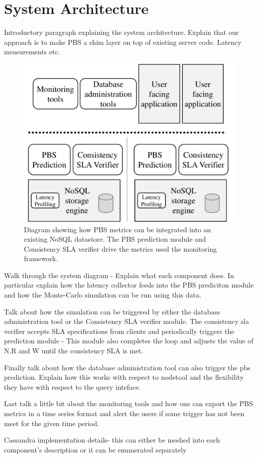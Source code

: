 \section{System Architecture}
\label{sec:architecture}

Introductory paragraph explaining the system architecture. Explain that our
approach is to make PBS a shim layer on top of existing server code. Latency
measurements etc.

\begin{figure}
\centering
\includegraphics[width=.90\columnwidth]{figs/pbs-sys-arch.pdf}
\caption{Diagram showing how PBS metrics can be integrated into an existing
NoSQL datastore. The PBS prediction module and Consistency SLA verifier drive
the metrics used the monitoring framework.}
\label{fig:pbs-sys-arch}
\end{figure}

Walk through the system diagram - Explain what each component does. In
particular explain how the latency collector feeds into the PBS prediciton
module and how the Monte-Carlo simulation can be run using this data.

Talk about how the simulation can be triggered by either the database
administration tool or the Consistency SLA verifier module. The consistency sla
verifier accepts SLA specifications from clients and periodically triggers the
prediction module - This module also completes the loop and adjusts the value of
N,R and W until the consistency SLA is met.

Finally talk about how the database administration tool can also trigger the pbs
prediction. Explain how this works with respect to nodetool and the flexibility
they have with respect to the query inteface.

Last talk a little bit about the monitoring tools and how one can export the PBS
metrics in a time series format and alert the users if some trigger has not been
meet for the given time period.

Cassandra implementation details- this can either be meshed into each
component's description or it can be enumerated separately
